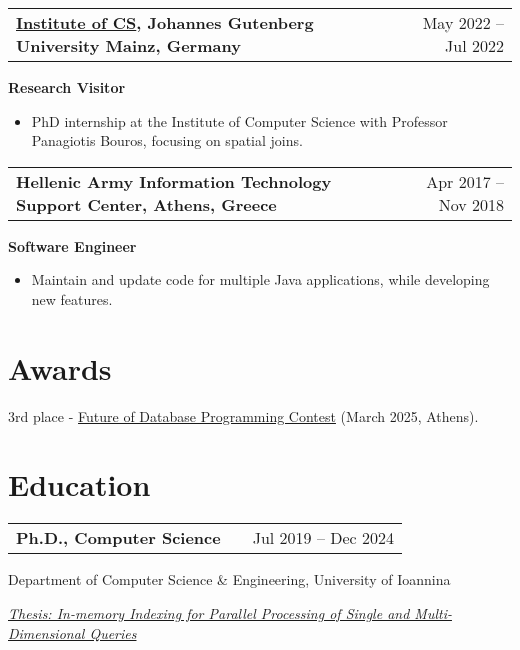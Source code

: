 \documentclass[a4paper,12pt]{article}
\makeatletter
\newenvironment{job}[2]
{
	\begin{tabularx}{\linewidth}{@{}l X r@{}}
		\small
		\textbf{#1} & \hfill &  #2 \\[3.75pt]
	\end{tabularx}
	\begin{minipage}[t]{\linewidth}
		\footnotesize
		\setlength{\parskip}{3pt} %
		\setlength{\parindent}{0pt} %
	}
	{
	\end{minipage}    
}
\makeatother
\begin{document}
\vspace{-2\baselineskip}

\begin{job}{\href{https://www.informatik.uni-mainz.de/en/}{Institute of CS}, Johannes Gutenberg University Mainz, Germany}{May 2022 – Jul 2022}
	\textbf{Research Visitor}
	
	\begin{itemize}
		
		\item PhD internship at the Institute of Computer Science with Professor Panagiotis Bouros, focusing on spatial joins.
	\end{itemize}
	
\end{job}



\begin{job}{Hellenic Army Information Technology Support Center, Athens, Greece}{Apr 2017 – Nov 2018}
\textbf{Software Engineer}
	
	\begin{itemize}
		
		\item Maintain and update code for multiple Java applications, while developing new features.
	\end{itemize}
	
\end{job}



\section{Awards}
\small 3rd place - \href{https://databasecontest2024.athenarc.gr/}{Future of Database Programming Contest} (March 2025, Athens).

\newpage
\section{Education}

\begin{job}{Ph.D., Computer Science}{Jul 2019 – Dec 2024}
Department of Computer Science \& Engineering, University of Ioannina

\underline{\textit{Thesis: In-memory Indexing for Parallel Processing of Single and Multi-Dimensional Queries}}
\end{job}
\end{document}
